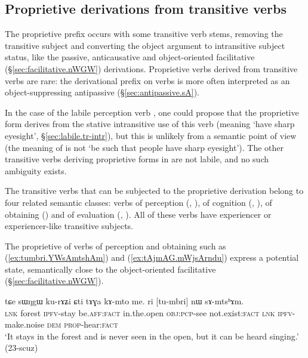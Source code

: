 \subsection{Proprietive derivations from transitive verbs} \label{sec:proprietive.tr}
The proprietive prefix occurs with some transitive verb stems, removing the transitive subject and converting the object  argument to intransitive subject status, like the passive, anticausative and object-oriented facilitative (§\ref{sec:facilitative.nWGW}) derivations. Proprietive verbs derived from transitive verbs are rare: the derivational  prefix on verbs is more often interpreted as an object-suppressing antipassive (§\ref{sec:antipassive.sA}).

In the case of the labile perception verb , one could propose that the proprietive form  derives from the stative intransitive use of this verb (meaning `have sharp eyesight', §\ref{sec:labile.tr-intr}), but this is unlikely from a semantic point of view (the meaning of  is not `be such that people have sharp eyesight'). The other transitive verbs deriving proprietive forms in  are not labile, and no such ambiguity exists.

The transitive verbs that can be subjected to the proprietive derivation belong to four related semantic classes: verbs of perception (, ), of cognition (, ), of obtaining () and of evaluation (, ). All of these verbs have experiencer or experiencer-like transitive subjects.

The proprietive of verbs of perception and obtaining such as  (\ref{ex:tumbri.YWsAmtshAm}) and  (\ref{ex:tAjmAG.mWjsArndu}) express a potential state, semantically close to the object-oriented facilitative (§\ref{sec:facilitative.nWGW}).

\begin{exe}
\ex \label{ex:tumbri.YWsAmtshAm}
\gll tɕe sɯŋgɯ ku-rɤʑi ɕti tɤɣa kɤ-mto me. ri [tu-mbri] nɯ sɤ-mtsʰɤm.\\
\textsc{lnk} forest \textsc{ipfv}-stay be.\textsc{aff}:\textsc{fact} in.the.open \textsc{obj}:\textsc{pcp}-see not.exist:\textsc{fact} \textsc{lnk} \textsc{ipfv}-make.noise \textsc{dem} \textsc{prop}-hear:\textsc{fact} \\
\glt `It stays in the forest and is never seen in the open, but it can be heard singing.' (23-scuz)
\end{exe}

